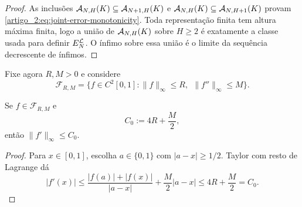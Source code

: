\begin{proof}
As inclusões
$\mathcal{A}_{N,H}(K)\subseteq\mathcal{A}_{N+1,H}(K)$ e
$\mathcal{A}_{N,H}(K)\subseteq\mathcal{A}_{N,H+1}(K)$ provam
\eqref{artigo_2:eq:joint-error-monotonicity}. Toda representação finita tem altura
máxima finita, logo a união de $\mathcal{A}_{N,H}(K)$ sobre $H\ge2$ é exatamente
a classe usada para definir $E_N^{\mathcal{L}}$. O ínfimo sobre essa união é o
limite da sequência decrescente de ínfimos.
\end{proof}

Fixe agora $R,M>0$ e considere
\begin{equation}
 \mathcal{F}_{R,M}=\{f\in C^2[0,1]:\|f\|_\infty\le R,\
                                  \ \|f''\|_\infty\le M\}.
 \label{artigo_2:eq:function-class}
\end{equation}

\begin{lemma}\label{map:artigo_2:3.15}
\label{artigo_2:lem:derivative-control}
Se $f\in\mathcal F_{R,M}$ e
\begin{equation}
 C_0:=4R+\frac M2,
 \label{artigo_2:eq:derivative-constant}
\end{equation}
então $\|f'\|_\infty\le C_0$.
\end{lemma}

\begin{proof}
Para $x\in[0,1]$, escolha $a\in\{0,1\}$ com $|a-x|\ge1/2$. Taylor com
resto de Lagrange dá
\begin{equation}
 |f'(x)|
 \le\frac{|f(a)|+|f(x)|}{|a-x|}+\frac{M}{2}|a-x|
 \le4R+\frac M2=C_0.
 \label{artigo_2:eq:derivative-control}
\end{equation}
\end{proof}

